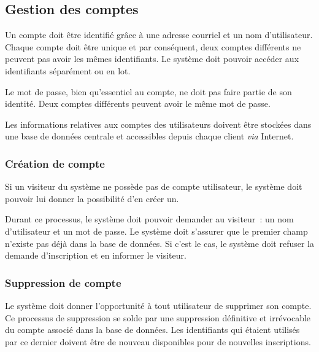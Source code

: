 \subsection{Gestion des comptes}

Un compte doit être identifié grâce à une adresse courriel
et un nom d'utilisateur. Chaque compte doit être unique
et par conséquent, deux comptes différents ne peuvent pas avoir
les mêmes identifiants. Le système doit pouvoir accéder aux
identifiants séparément ou en lot.

Le mot de passe, bien qu'essentiel au compte, ne doit pas
faire
partie de son identité. Deux comptes différents
peuvent avoir le même mot de passe.

Les informations relatives aux comptes des utilisateurs
doivent être stockées dans une base de données centrale et
accessibles depuis chaque client \emph{via} Internet.

\subsubsection{Création de compte}

Si un visiteur du système ne possède pas de compte
utilisateur, le système doit pouvoir lui donner la
possibilité d'en créer un.

Durant ce processus, le système doit pouvoir demander au
visiteur~: un nom d'utilisateur et un
mot de passe. Le système doit s'assurer que le
premier champ n'existe pas déjà dans la base de données.
Si c'est le cas, le système doit refuser la demande
d'inscription et en informer le visiteur.


\subsubsection{Suppression de compte}

Le système doit donner l'opportunité à tout utilisateur de
supprimer son compte. Ce processus de suppression se solde
par une suppression définitive et irrévocable du compte
associé dans la base de données.
Les identifiants qui étaient utilisés par ce
dernier doivent être de nouveau disponibles pour de
nouvelles inscriptions.

